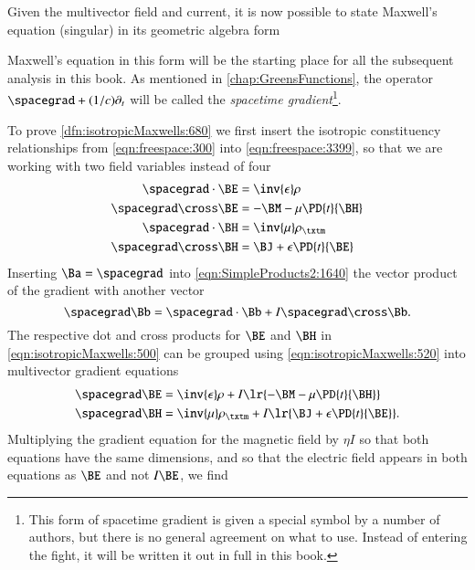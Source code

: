 Given the multivector field and current, it is now possible to state Maxwell's equation (singular) in its geometric algebra form

Maxwell's equation in this form will be the starting place for all the subsequent analysis in this book.
As mentioned in \cref{chap:GreensFunctions}, the operator \( \spacegrad + (1/c) \partial_t \) will be called the \textit{spacetime gradient}\footnote{This form of spacetime gradient is given a special symbol by a number of authors, but there is no general agreement on what to use.
Instead of entering the fight, it will be written it out in full in this book.}.

To prove \cref{dfn:isotropicMaxwells:680} we
first insert the
isotropic
constituency relationships from \cref{eqn:freespace:300} into
\cref{eqn:freespace:3399}, so that we are working with two field variables instead of four
\begin{dmath}\label{eqn:isotropicMaxwells:500}
\begin{aligned}
\spacegrad \cdot \BE &= \inv{\epsilon} \rho \\
\spacegrad \cross \BE &= - \BM - \mu \PD{t}{\BH} \\
\spacegrad \cdot \BH &= \inv{\mu} \rho_\txtm \\
\spacegrad \cross \BH &= \BJ + \epsilon \PD{t}{\BE}
\end{aligned}
\end{dmath}
Inserting \( \Ba = \spacegrad \) into \cref{eqn:SimpleProducts2:1640} the vector product of the gradient with another vector
\begin{dmath}\label{eqn:isotropicMaxwells:520}
\spacegrad \Bb = \spacegrad \cdot \Bb + I \spacegrad \cross \Bb.
\end{dmath}
The respective dot and cross products for \( \BE \) and \( \BH \) in
\cref{eqn:isotropicMaxwells:500}
can be grouped using \cref{eqn:isotropicMaxwells:520} into multivector gradient equations
\begin{dmath}\label{eqn:isotropicMaxwells:540}
\begin{aligned}
\spacegrad \BE &= \inv{\epsilon} \rho + I \lr{ - \BM - \mu \PD{t}{\BH} } \\
\spacegrad \BH &= \inv{\mu} \rho_\txtm + I \lr{ \BJ + \epsilon \PD{t}{\BE} }.
\end{aligned}
\end{dmath}
Multiplying the gradient equation for the magnetic field by \( \eta I \) so that both equations have the same dimensions, and so that the electric field appears in both equations as \( \BE \) and not \( I \BE \), we find
